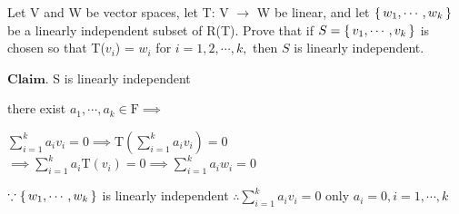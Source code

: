 Let V and W be vector spaces, let T: V $\rightarrow$ W be linear, and let $\left\{ \,w_1,\cdots,w_k \,\right\}$ be a linearly independent subset of R(T). Prove that if $S = \left\{ \,v_1,\cdots,v_k \,\right\}$ is chosen so that T($v_i$) = $w_i$ for $i=1,2,\cdots,k,$ then $S$ is linearly independent.

\begin{tcolorbox}
\begin{solution}
	$\textbf{Claim.}$ S is linearly independent
	
	there exist $a_1,\cdots,a_k \in \mathrm{F} \implies$
	
	$\sum^{k}_{i=1}a_iv_i=0 \implies \mathrm{T}(\sum^{k}_{i=1}a_iv_i) = 0$
	$\implies \sum^{k}_{i=1}a_i \mathrm{T}(v_i)=0 \implies \sum^{k}_{i=1}a_iw_i = 0$
	
	$\because \left\{ \,w_1,\cdots,w_k \,\right\}$ is linearly independent
	$\therefore \sum^{k}_{i=1}a_iv_i = 0$ only $a_i=0, i=1,\cdots,k$
\end{solution}

\end{tcolorbox}